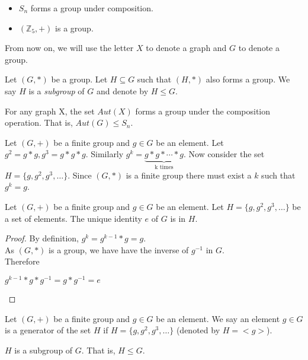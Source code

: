 \begin{example}
\begin{itemize}
\item $S_n$ forms a group under composition.
\item $(\mathbb{Z}_5,+)$ is a group.
\end{itemize}
\end{example}

From now on, we will use the letter $X$ to denote a graph and $G$ to denote a group.

\begin{remark} 
Let $(G,*)$ be a group. Let $H\subseteq G$ such that $(H,*)$ also forms a group. We say $H$ is a {\em subgroup} of $G$ and denote by $H\leq G$.   
\end{remark}


\begin{exercise}
For any graph X, the set $Aut(X)$ forms a group under the composition operation. That is, $Aut(G)\leq S_n$.
\end{exercise}


Let $(G,+)$ be a finite group and $g\in G$ be an element. Let $g^2 =  g*g ,g^3 =  g*g*g $. Similarly $g^k = \underbrace{g*g*\cdots * g}_\text{k times}$. Now consider the set $H=  \{g,g^2,g^3,\ldots\}$. Since $(G,*)$ is a finite group there must exist a $k$ such that $g^k=g$.

\begin{lemma}
Let $(G,+)$ be a finite group and $g\in G$ be an element. Let $H=\{g,g^2,g^3,\ldots\}$ be a set of elements. The unique identity $e$ of $G$ is in $H$.
\end{lemma}
\begin{proof}
By definition, $g^k = g^{k-1}*g = g$. \\
As $(G,*)$ is a group, we have have the inverse of $g^{-1}$ in $G$.\\
Therefore
\begin{center}
$g^{k-1}*g*g^{-1} = g*g^{-1} = e$ 
\end{center}
\end{proof}

\begin{definition}[Generator]
Let $(G,+)$ be a finite group and $g\in G$ be an element. We say an element $g\in G$ is a generator of the set $H$ if $H=  \{g,g^2,g^3,\ldots\}$ (denoted by $H=<g>$).
\end{definition}

\begin{observation}$H$ is a subgroup of $G$. That is, $H\leq G$.
\end{observation}

